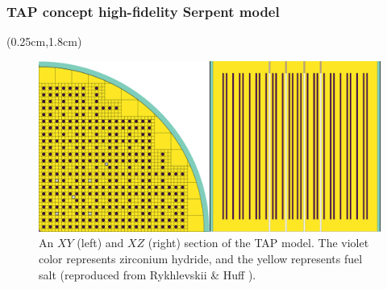 \begin{frame}
\frametitle{\gls{TAP} concept high-fidelity Serpent model}
	  \begin{textblock*}{12.25cm}(0.25cm,1.8cm) %
\begin{figure}[htp!] %
	\includegraphics[width=\textwidth]{./images/tap_model.png}
	\caption{An $XY$ (left) and $XZ$ (right) section of the \gls{TAP} model. 
	The violet color represents zirconium hydride, and the yellow represents 
	fuel salt (reproduced from Rykhlevskii \& Huff 
	\cite{rykhlevskii_milestone_2019}).}
\end{figure}
	  \end{textblock*}
\end{frame}



